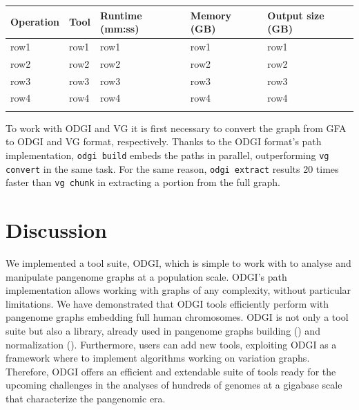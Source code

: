 \documentclass{bioinfo}
\begin{document}
    \begin{table}[!t]
         {
            \begin{tabular}{@{}lllll@{}}
                \toprule Operation & Tool & Runtime (mm:ss) & Memory (GB) & Output size (GB) \\
                \midrule
                row1               & row1 & row1            & row1        & row1             \\
                row2               & row2 & row2            & row2        & row2             \\
                row3               & row3 & row3            & row3        & row3             \\
                row4               & row4 & row4            & row4        & row4             \\
                \botrule
            \end{tabular}}

    \end{table}

    To work with ODGI and VG it is first necessary to convert the graph from GFA to ODGI and VG format, respectively.
    Thanks to the ODGI format's path implementation, \texttt{odgi build} embeds the paths in parallel, outperforming
    \texttt{vg convert} in the same task. For the same reason, \texttt{odgi extract} results 20 times faster than
    \texttt{vg chunk} in extracting a portion from the full graph.


    \section{Discussion}
    We implemented a tool suite, ODGI, which is simple to work with to analyse and manipulate pangenome graphs at a
    population scale. ODGI's path implementation allows working with graphs of any complexity, without particular
    limitations. We have demonstrated that ODGI tools efficiently perform with pangenome graphs embedding full human
    chromosomes. ODGI is not only a tool suite but also a library, already used in pangenome graphs building
    (\citep{pggb}) and normalization (\citep{smoothxg}). Furthermore, users can add new tools, exploiting ODGI as a
    framework where to implement algorithms working on variation graphs. Therefore, ODGI offers an efficient and
    extendable suite of tools ready for the upcoming challenges in the analyses of hundreds of genomes at a gigabase
    scale that characterize the pangenomic era.
\end{document}

